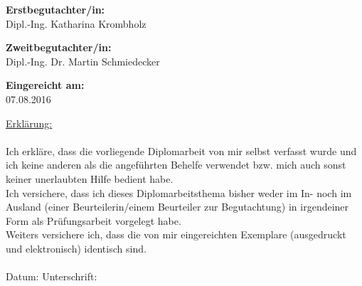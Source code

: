 \begin{center}
\hspace*{-1.0cm} \textbf{Erstbegutachter/in:} \\
\hspace*{-1.0cm} Dipl.-Ing. Katharina Krombholz \\

\vspace{0.5cm}

\hspace*{-1.0cm} \textbf{Zweitbegutachter/in:} \\
\hspace*{-1.0cm} Dipl.-Ing. Dr. Martin Schmiedecker \\


\vspace{1.4cm}

\hspace*{-1.0cm} \textbf{Eingereicht am:} \\
\hspace*{-1.0cm} 07.08.2016 \\

\end{center}

\newpage

\pagestyle{empty}

\vspace*{16.5cm}  %

\hspace*{-0.7cm} \underline{Erklärung:}\\\\
Ich erkläre, dass die vorliegende Diplomarbeit von mir selbst verfasst wurde und ich keine anderen als die angeführten Behelfe verwendet bzw. mich auch sonst keiner unerlaubten Hilfe bedient habe.\\
Ich versichere, dass ich dieses Diplomarbeitsthema bisher weder im In- noch im Ausland (einer Beurteilerin/einem Beurteiler zur Begutachtung) in irgendeiner Form als Prüfungsarbeit vorgelegt habe.\\
Weiters versichere ich, dass die von mir eingereichten Exemplare (ausgedruckt und elektronisch) identisch sind.\\\\
Datum: \hspace{6cm} Unterschrift:\\






